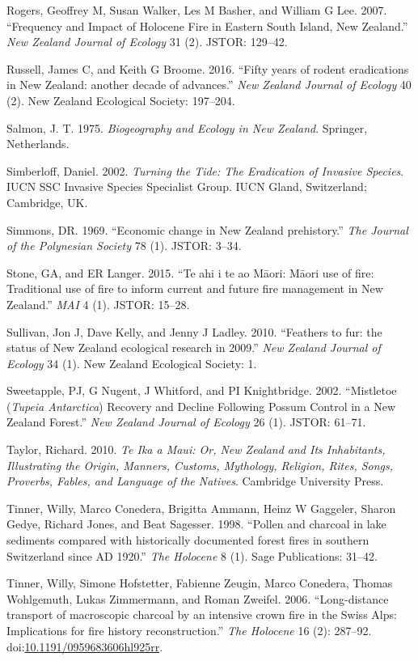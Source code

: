 \documentclass[]{article}
\begin{document}
Rogers, Geoffrey M, Susan Walker, Les M Basher, and William G Lee. 2007. ``Frequency and Impact of Holocene Fire in Eastern South Island, New Zealand.'' \emph{New Zealand Journal of Ecology} 31 (2). JSTOR: 129--42.

Russell, James C, and Keith G Broome. 2016. ``Fifty years of rodent eradications in New Zealand: another decade of advances.'' \emph{New Zealand Journal of Ecology} 40 (2). New Zealand Ecological Society: 197--204.

Salmon, J. T. 1975. \emph{Biogeography and Ecology in New Zealand}. Springer, Netherlands.

Simberloff, Daniel. 2002. \emph{Turning the Tide: The Eradication of Invasive Species}. IUCN SSC Invasive Species Specialist Group. IUCN Gland, Switzerland; Cambridge, UK.

Simmons, DR. 1969. ``Economic change in New Zealand prehistory.'' \emph{The Journal of the Polynesian Society} 78 (1). JSTOR: 3--34.

Stone, GA, and ER Langer. 2015. ``Te ahi i te ao Māori: Māori use of fire: Traditional use of fire to inform current and future fire management in New Zealand.'' \emph{MAI} 4 (1). JSTOR: 15--28.

Sullivan, Jon J, Dave Kelly, and Jenny J Ladley. 2010. ``Feathers to fur: the status of New Zealand ecological research in 2009.'' \emph{New Zealand Journal of Ecology} 34 (1). New Zealand Ecological Society: 1.

Sweetapple, PJ, G Nugent, J Whitford, and PI Knightbridge. 2002. ``Mistletoe (\emph{Tupeia Antarctica}) Recovery and Decline Following Possum Control in a New Zealand Forest.'' \emph{New Zealand Journal of Ecology} 26 (1). JSTOR: 61--71.

Taylor, Richard. 2010. \emph{Te Ika a Maui: Or, New Zealand and Its Inhabitants, Illustrating the Origin, Manners, Customs, Mythology, Religion, Rites, Songs, Proverbs, Fables, and Language of the Natives}. Cambridge University Press.

Tinner, Willy, Marco Conedera, Brigitta Ammann, Heinz W Gaggeler, Sharon Gedye, Richard Jones, and Beat Sagesser. 1998. ``Pollen and charcoal in lake sediments compared with historically documented forest fires in southern Switzerland since AD 1920.'' \emph{The Holocene} 8 (1). Sage Publications: 31--42.

Tinner, Willy, Simone Hofstetter, Fabienne Zeugin, Marco Conedera, Thomas Wohlgemuth, Lukas Zimmermann, and Roman Zweifel. 2006. ``Long-distance transport of macroscopic charcoal by an intensive crown fire in the Swiss Alps: Implications for fire history reconstruction.'' \emph{The Holocene} 16 (2): 287--92. doi:\href{https://doi.org/10.1191/0959683606hl925rr}{10.1191/0959683606hl925rr}.
\end{document}
